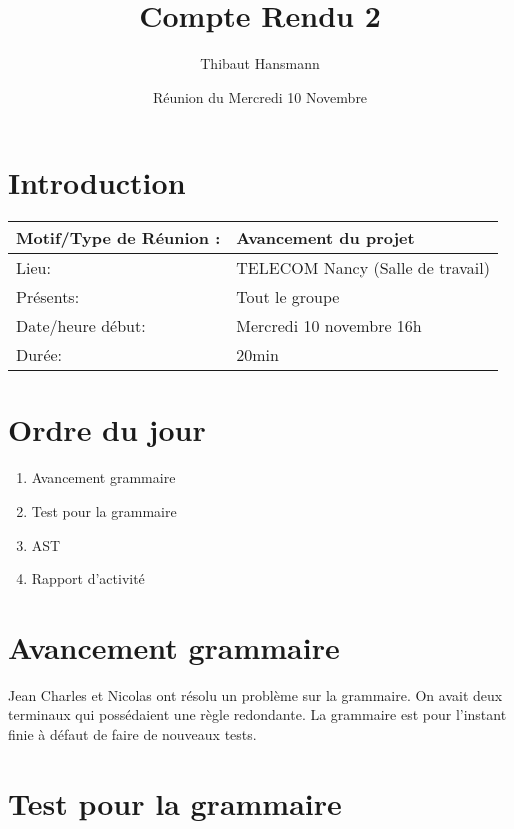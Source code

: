 \documentclass[french]{article}
\title{Compte Rendu 2}
\author{Thibaut Hansmann}
\date{Réunion du Mercredi 10 Novembre}
\begin{document}
\maketitle

\section*{Introduction}
\begin{flushleft}
 \begin{tabular}{|m{4cm}|m{8cm}|}
    \hline
    Motif/Type de Réunion :  & Avancement du projet  \\
    \hline
    Lieu:  & TELECOM Nancy (Salle de travail) \\
    \hline
    Présents:  & Tout le groupe \\
    \hline \hline
    Date/heure début:  & Mercredi 10 novembre 16h \\
    \hline
    Durée: & 20min \\
    \hline
 \end{tabular}
\end{flushleft}

\section*{Ordre du jour}

\begin{enumerate}
    \item Avancement grammaire \\
    \item Test pour la grammaire \\
    \item AST \\
    \item Rapport d'activité
\end{enumerate}

\section*{Avancement grammaire}

Jean Charles et Nicolas ont résolu un problème sur la grammaire. On avait deux terminaux qui possédaient une règle redondante. La grammaire est pour l'instant finie à défaut de faire de nouveaux tests.

\section*{Test pour la grammaire}
\end{document}
